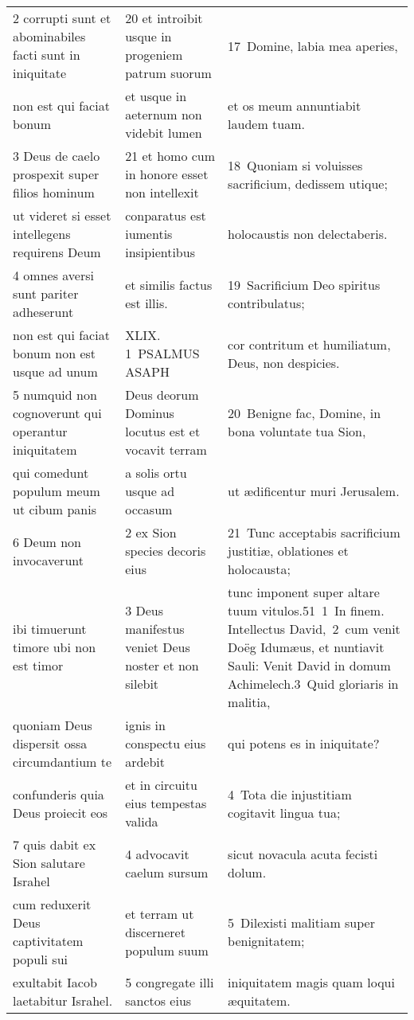\documentclass{article}
\begin{document}
\begin{longtable}{@{}p{}p{}p{}@{}}
2 corrupti sunt et abominabiles facti sunt in iniquitate	&	20 et introibit usque in progeniem patrum suorum	&	17 Domine, labia mea aperies,	\\
non est qui faciat bonum	&	et usque in aeternum non videbit lumen	&	et os meum annuntiabit laudem tuam.	\\
3 Deus de caelo prospexit super filios hominum	&	21 et homo cum in honore esset non intellexit	&	18 Quoniam si voluisses sacrificium, dedissem utique;	\\
ut videret si esset intellegens requirens Deum	&	conparatus est iumentis insipientibus	&	holocaustis non delectaberis.	\\
4 omnes aversi sunt pariter adheserunt	&	et similis factus est illis.	&	19 Sacrificium Deo spiritus contribulatus;	\\
non est qui faciat bonum non est usque ad unum	&	XLIX. 1 PSALMUS ASAPH	&	cor contritum et humiliatum, Deus, non despicies.	\\
5 numquid non cognoverunt qui operantur iniquitatem	&	Deus deorum Dominus locutus est et vocavit terram	&	20 Benigne fac, Domine, in bona voluntate tua Sion,	\\
qui comedunt populum meum ut cibum panis	&	a solis ortu usque ad occasum	&	ut ædificentur muri Jerusalem.	\\
6 Deum non invocaverunt	&	2 ex Sion species decoris eius	&	21 Tunc acceptabis sacrificium justitiæ, oblationes et holocausta;	\\
ibi timuerunt timore ubi non est timor	&	3 Deus manifestus veniet Deus noster et non silebit	&	tunc imponent super altare tuum vitulos.51 1 In finem. Intellectus David, 2 cum venit Doëg Idumæus, et nuntiavit Sauli: Venit David in domum Achimelech.3 Quid gloriaris in malitia,	\\
quoniam Deus dispersit ossa circumdantium te	&	ignis in conspectu eius ardebit	&	qui potens es in iniquitate?	\\
confunderis quia Deus proiecit eos	&	et in circuitu eius tempestas valida	&	4 Tota die injustitiam cogitavit lingua tua;	\\
7 quis dabit ex Sion salutare Israhel	&	4 advocavit caelum sursum	&	sicut novacula acuta fecisti dolum.	\\
cum reduxerit Deus captivitatem populi sui	&	et terram ut discerneret populum suum	&	5 Dilexisti malitiam super benignitatem;	\\
exultabit Iacob laetabitur Israhel.	&	5 congregate illi sanctos eius	&	iniquitatem magis quam loqui æquitatem.	\\

\end{longtable}
\end{document}

